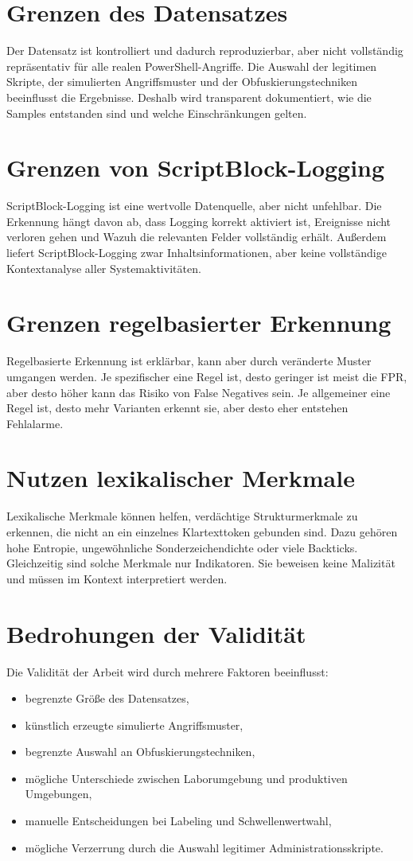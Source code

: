 \documentclass[12pt,a4paper,oneside,parskip=half]{scrreprt}
\begin{document}
\section{Grenzen des Datensatzes}
Der Datensatz ist kontrolliert und dadurch reproduzierbar, aber nicht vollständig repräsentativ für alle realen PowerShell-Angriffe. Die Auswahl der legitimen Skripte, der simulierten Angriffsmuster und der Obfuskierungstechniken beeinflusst die Ergebnisse. Deshalb wird transparent dokumentiert, wie die Samples entstanden sind und welche Einschränkungen gelten.

\section{Grenzen von ScriptBlock-Logging}
ScriptBlock-Logging ist eine wertvolle Datenquelle, aber nicht unfehlbar. Die Erkennung hängt davon ab, dass Logging korrekt aktiviert ist, Ereignisse nicht verloren gehen und Wazuh die relevanten Felder vollständig erhält. Außerdem liefert ScriptBlock-Logging zwar Inhaltsinformationen, aber keine vollständige Kontextanalyse aller Systemaktivitäten.

\section{Grenzen regelbasierter Erkennung}
Regelbasierte Erkennung ist erklärbar, kann aber durch veränderte Muster umgangen werden. Je spezifischer eine Regel ist, desto geringer ist meist die FPR, aber desto höher kann das Risiko von False Negatives sein. Je allgemeiner eine Regel ist, desto mehr Varianten erkennt sie, aber desto eher entstehen Fehlalarme.

\section{Nutzen lexikalischer Merkmale}
Lexikalische Merkmale können helfen, verdächtige Strukturmerkmale zu erkennen, die nicht an ein einzelnes Klartexttoken gebunden sind. Dazu gehören hohe Entropie, ungewöhnliche Sonderzeichendichte oder viele Backticks. Gleichzeitig sind solche Merkmale nur Indikatoren. Sie beweisen keine Malizität und müssen im Kontext interpretiert werden.

\section{Bedrohungen der Validität}
Die Validität der Arbeit wird durch mehrere Faktoren beeinflusst:
\begin{itemize}
    \item begrenzte Größe des Datensatzes,
    \item künstlich erzeugte simulierte Angriffsmuster,
    \item begrenzte Auswahl an Obfuskierungstechniken,
    \item mögliche Unterschiede zwischen Laborumgebung und produktiven Umgebungen,
    \item manuelle Entscheidungen bei Labeling und Schwellenwertwahl,
    \item mögliche Verzerrung durch die Auswahl legitimer Administrationsskripte.
\end{itemize}
\end{document}
